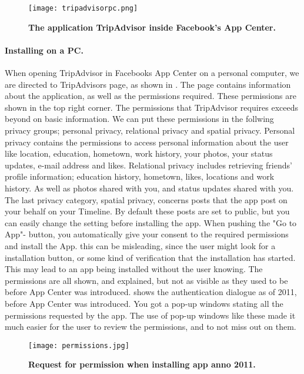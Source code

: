 \begin{figure}[t]
\centering
\texttt{[image: tripadvisorpc.png]}
\caption[The application TripAdvisor inside Facebook's App Center]{\textbf{The application TripAdvisor inside Facebook's App Center.} } 
\label{fig:tripadvisorpc}
\end{figure}


\paragraph{Installing on a PC.}
When opening TripAdvisor in Facebooks App Center on a personal computer, we are directed to TripAdvisors page, as shown in . The page contains information about the application, as well as the permissions required. These permissions are shown in the top right corner. The permissions that TripAdvisor requires exceeds beyond on basic information. We can put these permissions in the follwing privacy groups; personal privacy, relational privacy and spatial privacy. Personal privacy contains the permissions to access personal information about the user like location, education, hometown, work history, your photos, your status updates, e-mail address and likes. Relational privacy includes retrieving friends' profile information; education history, hometown, likes, locations and work history. As well as photos shared with you, and status updates shared with you. The last privacy category, spatial privacy, concerns posts that the app post on your behalf on your Timeline. By default these posts are set to public, but you can easily change the setting before installing the app. When pushing the "Go to App"- button, you automatically give your consent to the required permissions and install the App. this can be misleading, since the user might look for a installation button, or some kind of verification that the installation has started. This may lead to an app being installed without the user knowing. The permissions are all shown, and explained, but not as visible as they used to be before App Center was introduced.  shows the authentication dialogue as of 2011, before App Center was introduced. You got a pop-up windows stating all the permissions requested by the app. The use of pop-up windows like these made it much easier for the user to review the permissions, and to not miss out on them. 


\begin{figure}[t]
\centering
\texttt{[image: permissions.jpg]}
\caption[Request for permission when installing app anno 2011]{\textbf{Request for permission when installing app anno 2011.} } 
\label{fig:permissions2011}
\end{figure}

